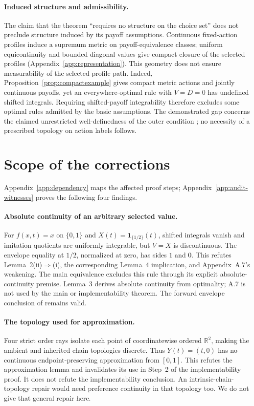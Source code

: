 \documentclass[11pt]{article}
\theoremstyle{remark}\newtheorem{remark}[theorem]{Remark}
\newcommand{\R}{\mathbb R}
\newcommand{\ind}{\mathbf 1}
\begin{document}
\paragraph{Induced structure and admissibility.}
The claim that the theorem ``requires no structure on the choice set'' \citep[Abstract]{Sinander2022} does not preclude structure induced by its payoff assumptions. Continuous fixed-action profiles induce a supremum metric on payoff-equivalence classes; uniform equicontinuity and bounded diagonal values give compact closure of the selected profiles (Appendix~\ref{app:representation}). This geometry does not ensure measurability of the selected profile path. Indeed, Proposition~\ref{prop:compactexample} gives compact metric actions and jointly continuous payoffs, yet an everywhere-optimal rule with $V=D=0$ has undefined shifted integrals. Requiring shifted-payoff integrability therefore excludes some optimal rules admitted by the basic assumptions. The demonstrated gap concerns the claimed unrestricted well-definedness of the outer condition \citep[Section~1]{Sinander2022}; no necessity of a prescribed topology on action labels follows.

\section{Scope of the corrections}\label{sec:scope}
Appendix~\ref{app:dependency} maps the affected proof steps; Appendix~\ref{app:audit-witnesses} proves the following four findings.

\paragraph{Absolute continuity of an arbitrary selected value.}
For $f(x,t)=x$ on $\{0,1\}$ and $X(t)=\ind_{\{1/2\}}(t)$, shifted integrals vanish and imitation quotients are uniformly integrable, but $V=X$ is discontinuous. The envelope equality at $1/2$, normalized at zero, has sides $1$ and $0$. This refutes Lemma~2(ii)$\Rightarrow$(i), the corresponding Lemma~4 implication, and Appendix~A.7's weakening. The main equivalence excludes this rule through its explicit absolute-continuity premise. Lemma~3 derives absolute continuity from optimality; A.7 is not used by the main or implementability theorem. The forward envelope conclusion of \citet{MilgromSegal2002} remains valid.

\paragraph{The topology used for approximation.}
Four strict order rays isolate each point of coordinatewise ordered $\R^2$, making the ambient and inherited chain topologies discrete. Thus $Y(t)=(t,0)$ has no continuous endpoint-preserving approximation from $[0,1]$. This refutes the approximation lemma and invalidates its use in Step~2 of the implementability proof. It does not refute the implementability conclusion. An intrinsic-chain-topology repair would need preference continuity in that topology too. We do not give that general repair here.
\end{document}
